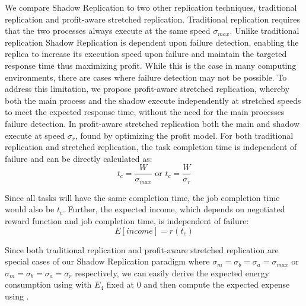 \noindent 
We compare Shadow Replication to two other replication techniques,
traditional replication and profit-aware stretched replication.
Traditional replication requires that the two processes always execute
at the same speed $\sigma_{max}$. Unlike traditional replication
Shadow Replication is dependent upon failure detection, enabling the
replica to increase its execution speed upon failure and maintain the
targeted response time thus maximizing profit. While this is the case
in many computing environments, there are cases where failure
detection may not be possible. To address this limitation, we propose
profit-aware stretched replication, whereby both the main process and
the shadow execute independently at stretched speeds to meet the
expected response time, without the need for the main processes failure
detection. In profit-aware stretched replication both the main and
shadow execute at speed $\sigma_r$, found by optimizing the profit
model.  For both traditional replication and stretched replication,
the task completion time is independent of failure and can be directly
calculated as:
\begin{equation}
t_c=\frac{W}{\sigma_{max}} \text{ or } t_c=\frac{W}{\sigma_r}
\end{equation}



Since all tasks will have the same completion time, the job completion
time would also be $t_c$. Further, the expected income, which depends
on negotiated reward function and job completion time, is independent
of failure:
\begin{equation}
E[income]=r(t_c)
\end{equation}

Since both traditional replication and profit-aware stretched
replication are special cases of our Shadow Replication paradigm where
$\sigma_m=\sigma_b=\sigma_a=\sigma_{max}$ or
$\sigma_m=\sigma_b=\sigma_a=\sigma_r$ respectively, we can easily derive the
expected energy consumption using  with $E_4$
fixed at 0 and then compute the expected expense using .
